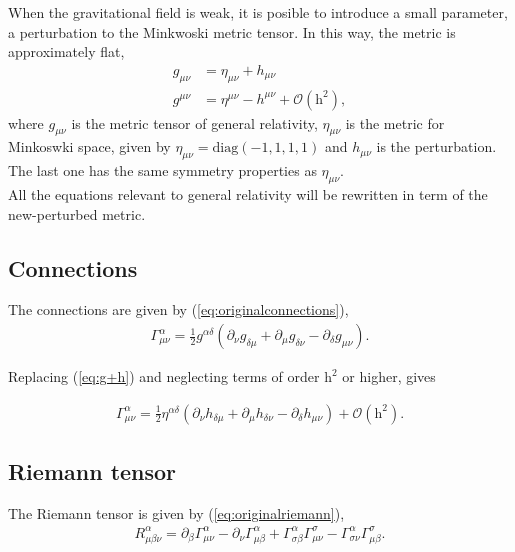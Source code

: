 When the gravitational field is weak, it is posible to introduce a small parameter, a perturbation to the Minkwoski metric tensor. In this way, the metric is approximately flat,
\begin{align}
	\label{eq:g+h}
	g_{\mu \nu} &= \eta_{\mu \nu} + h_{\mu \nu}\\
	\label{eq:g-h}
	g^{\mu \nu} &= \eta^{\mu \nu} - h^{\mu \nu} + \mathcal{O}(\text{h}^2),
\end{align}
where $g_{\mu \nu}$ is the metric tensor of general relativity, $\eta_{\mu \nu}$ is the metric for Minkoswki space, given by $\eta_{\mu \nu} = \text{diag}(-1,1,1,1)$ and $h_{\mu \nu}$ is the perturbation. The last one has the same symmetry properties as $\eta_{\mu \nu}$.\\

All the equations relevant to general relativity will be rewritten in term of the new-perturbed metric.


\subsection*{Connections}
The connections are given by (\ref{eq:originalconnections}),
\begin{align}
	\Gamma^{\alpha}_{\mu\nu} = \frac{1}{2} g^{\alpha\delta}(\partial_{\nu}g_{\delta\mu}+\partial_{\mu}g_{\delta\nu}-\partial_{\delta}g_{\mu\nu}).
	\label{eq:originalconnections}
\end{align}

Replacing (\ref{eq:g+h}) and neglecting terms of order $\text{h}^2$ or higher, gives

\begin{align}
	\Gamma^{\alpha}_{\mu\nu} = \frac{1}{2} \eta^{\alpha\delta}(\partial_{\nu}h_{\delta\mu}+\partial_{\mu}h_{\delta\nu}-\partial_{\delta}h_{\mu\nu}) + \mathcal{O}(\text{h}^2).
	\label{eq:approxconnections}
\end{align}

\subsection*{Riemann tensor}

The Riemann tensor is given by (\ref{eq:originalriemann}),
\begin{align}
	R^{\alpha}_{\mu\beta\nu} = \partial_\beta\Gamma^{\alpha}_{\mu\nu} -\partial_\nu\Gamma^{\alpha}_{\mu\beta}+\Gamma^{\alpha}_{\sigma\beta}  \Gamma^{\sigma}_{\mu\nu}  - \Gamma^{\alpha}_{\sigma\nu}  \Gamma^{\sigma}_{\mu\beta} .
	\label{eq:originalriemann}
\end{align}

